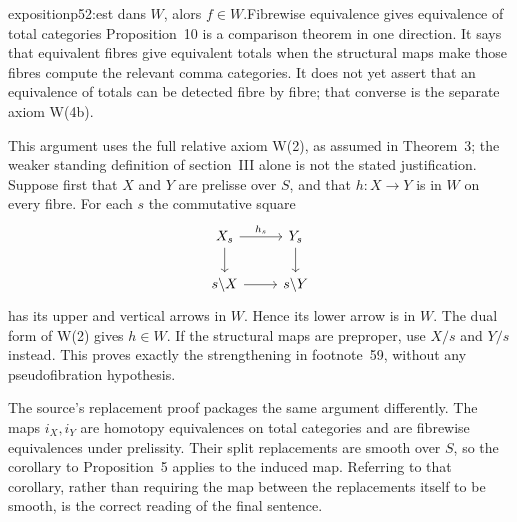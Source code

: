 \begin{dcomment}{exposition}{p52:est dans $W$, alors $f \in W$.}{Fibrewise equivalence gives equivalence of total categories}
Proposition~10 is a comparison theorem in one direction. It says that equivalent fibres give equivalent totals when the structural maps make those fibres compute the relevant comma categories. It does not yet assert that an equivalence of totals can be detected fibre by fibre; that converse is the separate axiom W(4b).

This argument uses the full relative axiom W(2), as assumed in Theorem~3; the weaker standing definition of section~III alone is not the stated justification. Suppose first that $X$ and $Y$ are prelisse over $S$, and that $h:X\to Y$ is in $W$ on every fibre. For each $s$ the commutative square
\[
\begin{tikzcd}
 X_s\arrow[r,"h_s"]\arrow[d] &Y_s\arrow[d]\\
 s\backslash X\arrow[r] &s\backslash Y
\end{tikzcd}
\]
has its upper and vertical arrows in $W$. Hence its lower arrow is in $W$. The dual form of W(2) gives $h\in W$. If the structural maps are preproper, use $X/s$ and $Y/s$ instead. This proves exactly the strengthening in footnote~59, without any pseudofibration hypothesis.

The source's replacement proof packages the same argument differently. The maps $i_X,i_Y$ are homotopy equivalences on total categories and are fibrewise equivalences under prelissity. Their split replacements are smooth over $S$, so the corollary to Proposition~5 applies to the induced map. Referring to that corollary, rather than requiring the map between the replacements itself to be smooth, is the correct reading of the final sentence.
\end{dcomment}


